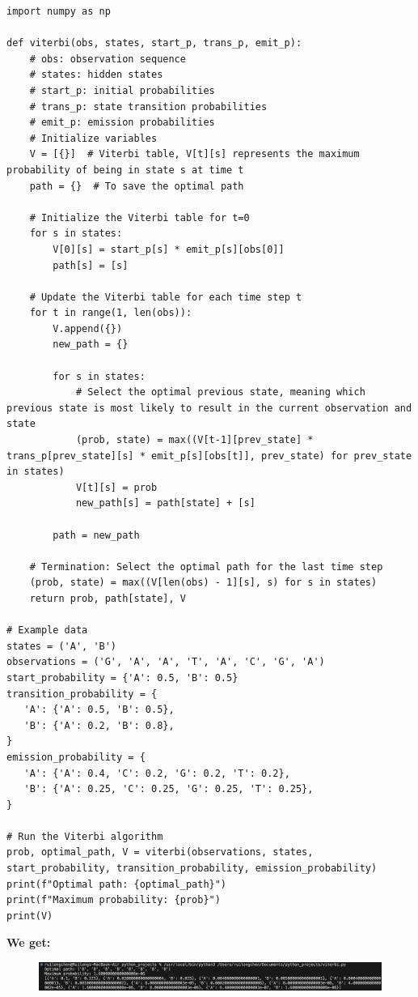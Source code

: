 \documentclass{article}
\begin{document}
\begin{center}
    \begin{lstlisting} 
import numpy as np

def viterbi(obs, states, start_p, trans_p, emit_p):
    # obs: observation sequence
    # states: hidden states
    # start_p: initial probabilities
    # trans_p: state transition probabilities
    # emit_p: emission probabilities   
    # Initialize variables
    V = [{}]  # Viterbi table, V[t][s] represents the maximum probability of being in state s at time t
    path = {}  # To save the optimal path
    
    # Initialize the Viterbi table for t=0
    for s in states:
        V[0][s] = start_p[s] * emit_p[s][obs[0]]
        path[s] = [s]
    
    # Update the Viterbi table for each time step t
    for t in range(1, len(obs)):
        V.append({})
        new_path = {}

        for s in states:
            # Select the optimal previous state, meaning which previous state is most likely to result in the current observation and state
            (prob, state) = max((V[t-1][prev_state] * trans_p[prev_state][s] * emit_p[s][obs[t]], prev_state) for prev_state in states)
            V[t][s] = prob
            new_path[s] = path[state] + [s]
        
        path = new_path

    # Termination: Select the optimal path for the last time step
    (prob, state) = max((V[len(obs) - 1][s], s) for s in states)
    return prob, path[state], V

# Example data
states = ('A', 'B')
observations = ('G', 'A', 'A', 'T', 'A', 'C', 'G', 'A')
start_probability = {'A': 0.5, 'B': 0.5}
transition_probability = {
   'A': {'A': 0.5, 'B': 0.5},
   'B': {'A': 0.2, 'B': 0.8},
}
emission_probability = {
   'A': {'A': 0.4, 'C': 0.2, 'G': 0.2, 'T': 0.2},
   'B': {'A': 0.25, 'C': 0.25, 'G': 0.25, 'T': 0.25},
}

# Run the Viterbi algorithm
prob, optimal_path, V = viterbi(observations, states, start_probability, transition_probability, emission_probability)
print(f"Optimal path: {optimal_path}")
print(f"Maximum probability: {prob}")
print(V)
\end{lstlisting}
\end{center}
\textbf{We get:}



\begin{figure}[H]
    \centering
    \includegraphics[width=1\textwidth]{coderesult.jpg}  %
\end{figure}
\end{document}
